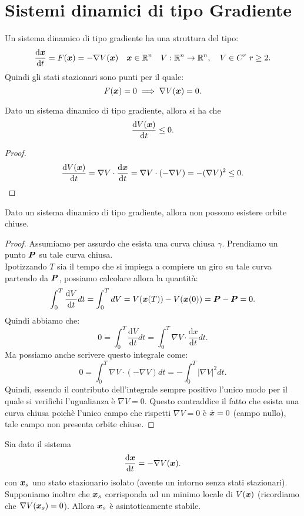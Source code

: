 \section{Sistemi dinamici di tipo Gradiente}%
\label{sub:SIstemi dinamici di tipo Gradiente}
Un sistema dinamico di tipo gradiente ha una struttura del tipo:
\[
    \frac{\text{d} \boldsymbol{x}}{\text{d} t} = F(\boldsymbol{x}) = - \nabla V(\boldsymbol{x}) \quad 
    \boldsymbol{x}\in \mathbb{R}^n \quad  V:\mathbb{R}^n\to \mathbb{R}^n, \quad V \in C^r \ r\ge 2
.\] 
Quindi gli stati stazionari sono punti per il quale:
\[
    F(\boldsymbol{x}) = 0 \implies  \nabla V(\boldsymbol{x}) = 0
.\] 
\begin{thm}
    Dato un sistema dinamico di tipo gradiente, allora si ha che 
    \[
	\frac{\text{d} V(\boldsymbol{x}) }{\text{d} t} \le 0
    .\] 
\end{thm}
\noindent
\begin{proof}
    \[
	\frac{\text{d} V(\boldsymbol{x}) }{\text{d} t} = \nabla V \cdot \frac{\text{d} \boldsymbol{x}}{\text{d} t} = \nabla V \cdot (-\nabla V) = -(\nabla V)^2 \le 0
    .\] 
\end{proof}
\begin{thm}
    Dato un sistema dinamico di tipo gradiente, allora non possono esistere orbite chiuse.
\end{thm}
\noindent
\begin{proof}
    Assumiamo per assurdo che esista una curva chiusa $\gamma$. Prendiamo un punto $\boldsymbol{P}$ su tale curva chiusa.\\
    Ipotizzando $T$ sia il tempo che si impiega a compiere un giro su tale curva partendo da $\boldsymbol{P}$, possiamo calcolare allora la quantità:
    \[
	\int_0^T \frac{\text{d} V}{\text{d} t} dt = \int_0^T dV = V(\boldsymbol{x}(T) ) - V(\boldsymbol{x}(0) ) = \boldsymbol{P}-\boldsymbol{P} = 0
    .\] 
    Quindi abbiamo che:
    \[
        0 = \int_{0}^{T} \frac{\text{d} V}{\text{d} t}dt = \int_{0}^{T} \nabla V \cdot \frac{\text{d} x}{\text{d} t} dt  
    .\] 
    Ma possiamo anche scrivere questo integrale come:
    \[
	0 = \int_{0}^{T} \nabla V\cdot (-\nabla V) dt = - \int_{0}^{T} \left|\nabla V\right|^2 dt  
    .\] 
    Quindi, essendo il contributo dell'integrale sempre positivo l'unico modo per il quale si verifichi l'ugualianza è $\nabla V = 0$. Questo contraddice  il fatto che esista una curva chiusa poichè l'unico campo che rispetti $\nabla V = 0$ è $\dot{\boldsymbol{x}}=0$ (campo nullo), tale campo non presenta orbite chiuse.
\end{proof}
\begin{thm}
    Sia dato il sistema 
     \[
	 \frac{\text{d} \boldsymbol{x}}{\text{d} t} = -\nabla V(\boldsymbol{x}) 
     .\] con $\boldsymbol{x}_s$ uno stato stazionario isolato (avente un intorno senza stati stazionari). Supponiamo inoltre che $\boldsymbol{x}_s$ corrisponda ad un minimo locale di $V(\boldsymbol{x})$ (ricordiamo che $\nabla V(\boldsymbol{x}_s) = 0$). Allora $\boldsymbol{x}_s$ è asintoticamente stabile.
\end{thm}
\noindent
